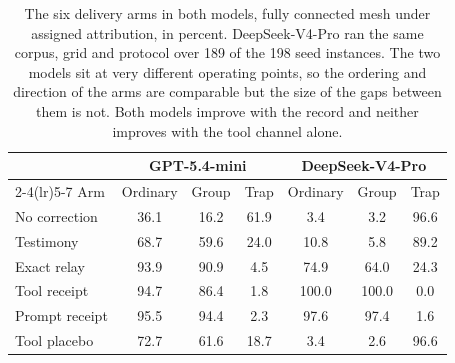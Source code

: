 \begin{table}[!ht]
\centering
\caption{The six delivery arms in both models, fully connected mesh under
assigned attribution, in percent. DeepSeek-V4-Pro ran the same corpus, grid
and protocol over 189 of the 198 seed instances. The two models sit at very
different operating points, so the ordering and direction of the arms are
comparable but the size of the gaps between them is not. Both models improve
with the record and neither improves with the tool channel alone.}
\label{tab:crossmodel}
\small
\begin{tabular}{lcccccc}
\toprule
& \multicolumn{3}{c}{GPT-5.4-mini} & \multicolumn{3}{c}{DeepSeek-V4-Pro} \\
\cmidrule(lr){2-4}\cmidrule(lr){5-7}
Arm & Ordinary & Group & Trap & Ordinary & Group & Trap \\
\midrule
No correction & 36.1 & 16.2 & 61.9 & 3.4 & 3.2 & 96.6 \\
Testimony & 68.7 & 59.6 & 24.0 & 10.8 & 5.8 & 89.2 \\
Exact relay & 93.9 & 90.9 & 4.5 & 74.9 & 64.0 & 24.3 \\
Tool receipt & 94.7 & 86.4 & 1.8 & 100.0 & 100.0 & 0.0 \\
Prompt receipt & 95.5 & 94.4 & 2.3 & 97.6 & 97.4 & 1.6 \\
Tool placebo & 72.7 & 61.6 & 18.7 & 3.4 & 2.6 & 96.6 \\
\bottomrule
\end{tabular}
\end{table}
